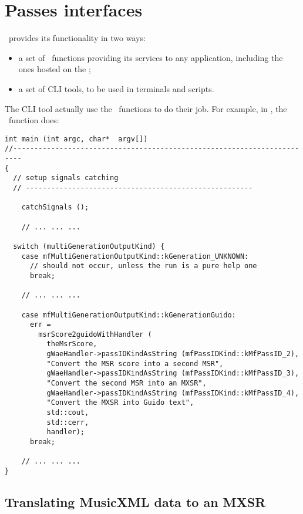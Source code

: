 
\chapter{Passes interfaces}

\mf\ provides its functionality in two ways:
\begin{itemize}
\item a set of \API\ functions providing its services to any application, including the ones hosted on the \Web;
\item a set of CLI tools, to be used in terminals and scripts.
\end{itemize}

The CLI tool actually use the \API\ functions to do their job. For example, in {\tt }, the \mainFunction\ function does:
\begin{lstlisting}[language=CPlusPlus]
int main (int argc, char*  argv[])
//------------------------------------------------------------------------
{
  // setup signals catching
  // ------------------------------------------------------

	catchSignals ();

	// ... ... ...

  switch (multiGenerationOutputKind) {
    case mfMultiGenerationOutputKind::kGeneration_UNKNOWN:
      // should not occur, unless the run is a pure help one
      break;

  	// ... ... ...

    case mfMultiGenerationOutputKind::kGenerationGuido:
      err =
        msrScore2guidoWithHandler (
          theMsrScore,
          gWaeHandler->passIDKindAsString (mfPassIDKind::kMfPassID_2),
          "Convert the MSR score into a second MSR",
          gWaeHandler->passIDKindAsString (mfPassIDKind::kMfPassID_3),
          "Convert the second MSR into an MXSR",
          gWaeHandler->passIDKindAsString (mfPassIDKind::kMfPassID_4),
          "Convert the MXSR into Guido text",
          std::cout,
          std::cerr,
          handler);
      break;

	// ... ... ...
}
\end{lstlisting}


\section{Translating MusicXML data to an MXSR}


